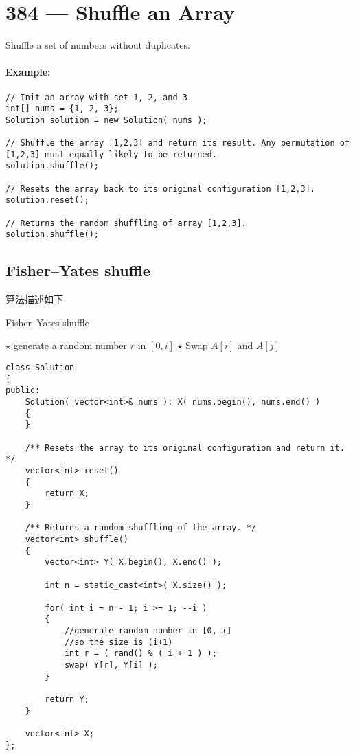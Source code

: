 \section{384 --- Shuffle an Array}
Shuffle a set of numbers without duplicates.

\paragraph{Example:}

\begin{lstlisting}[style=customc]
// Init an array with set 1, 2, and 3.
int[] nums = {1, 2, 3};
Solution solution = new Solution( nums );

// Shuffle the array [1,2,3] and return its result. Any permutation of [1,2,3] must equally likely to be returned.
solution.shuffle();

// Resets the array back to its original configuration [1,2,3].
solution.reset();

// Returns the random shuffling of array [1,2,3].
solution.shuffle();

\end{lstlisting}

\subsection{Fisher–Yates shuffle}
算法描述如下
\setcounter{algorithm}{0}
\begin{algorithm}[H]
\caption{Fisher–Yates shuffle}
\begin{algorithmic}[1]
\State $\star$ generate a random number $r$ in $[0, i]$
\State $\star$ Swap $A[i]$ and $A[j]$
\EndFor
\EndProcedure
\end{algorithmic}
\end{algorithm}

\setcounter{lstlisting}{0}
\begin{lstlisting}[style=customc, caption={Fisher–Yates shuffle}]
class Solution
{
public:
    Solution( vector<int>& nums ): X( nums.begin(), nums.end() )
    {
    }

    /** Resets the array to its original configuration and return it. */
    vector<int> reset()
    {
        return X;
    }

    /** Returns a random shuffling of the array. */
    vector<int> shuffle()
    {
        vector<int> Y( X.begin(), X.end() );

        int n = static_cast<int>( X.size() );

        for( int i = n - 1; i >= 1; --i )
        {
            //generate random number in [0, i]
            //so the size is (i+1)
            int r = ( rand() % ( i + 1 ) );
            swap( Y[r], Y[i] );
        }

        return Y;
    }

    vector<int> X;
};

\end{lstlisting}